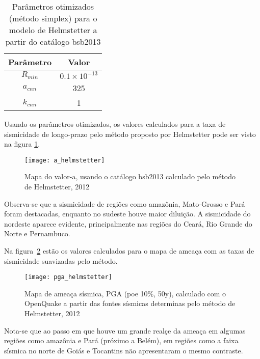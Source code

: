 \begin{table}[H]
	\centering
	\begin{tabular}{c|c}
		Parâmetro & Valor \\ \hline
		$R_{min}$ & $0.1\times10^{-13}$ \\
		$a_{cnn}$ & 325 \\
		$k_{cnn}$ & 1 \\
	\end{tabular}
	\caption{Parâmetros otimizados (método simplex) para o modelo de Helmstetter a partir do catálogo \gls{bsb2013}}
	\label{tab:hemlstetter}
\end{table}

Usando os parâmetros otimizados, os valores calculados para a taxa de sismicidade
de longo-prazo pelo método proposto por Helmstetter pode ser visto na figura \ref{fig:helm_r}.

\begin{figure}[H]
  \centering
  \texttt{[image: a\_helmstetter]} 
  \caption{Mapa do valor-a, usando o catálogo \gls{bsb2013} calculado pelo método de Helmstetter, 2012 }
  \label{fig:helm_r} 
\end{figure}

Observa-se que a sismicidade de regiões como amazônia, Mato-Grosso e Pará foram destacadas,
enquanto no sudeste houve maior diluição. A sismicidade do nordeste aparece evidente, principalmente
nas regiões do Ceará, Rio Grande do Norte e Pernambuco.

Na figura~\ref{fig:helm_h} estão os valores calculados para o mapa de ameaça 
com as taxas de sismicidade suavizadas pelo método.

\begin{figure}[H]
  \centering
  \texttt{[image: pga\_helmstetter]} 
  \caption{Mapa de ameaça sísmica, PGA (poe 10\%, 50y), 
  		   calculado com o OpenQuake a partir das fontes sísmicas
  		   determinas pelo método de Helmstetter, 2012 }
  \label{fig:helm_h} 
\end{figure}

Nota-se que ao passo em que houve um grande realçe da ameaça em algumas regiões como amazônia e Pará (próximo a Belém),
em regiões como a faixa sísmica no norte de Goiás e Tocantins não apresentaram o mesmo contraste.


